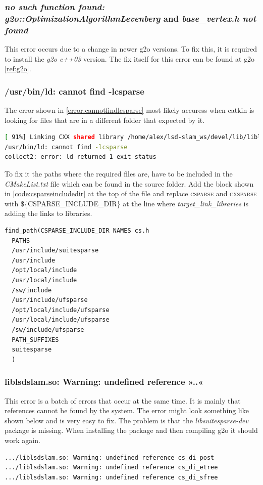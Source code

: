 \subsubsection{\textit{no such function found: g2o::OptimizationAlgorithmLevenberg} and \textit{base\_vertex.h not found}}
This error occurs due to a change in newer \gls{g2o} versions. To fix this, it is required to install the \textit{g2o c++03} version. The fix  itself for this error can be found at \gls{g2o} \ref{ref:g2o}.

\subsubsection{/usr/bin/ld: cannot find -lcsparse}
The error shown in \ref{error:cannotfindlcsparse} most likely accuress when catkin is looking for files that are in a different folder that expected by it.\newline
\begin{lstlisting}[language=bash,label={error:cannotfindlcsparse}]
[ 91%] Linking CXX shared library /home/alex/lsd-slam_ws/devel/lib/liblsdslam.so
/usr/bin/ld: cannot find -lcsparse
collect2: error: ld returned 1 exit status
\end{lstlisting}
To fix it the paths where the required files are, have to be included in the \textit{CMakeList.txt} file which can be found in the source folder. Add the block shown in \ref{code:csparseincludedir} at the top of the file and replace \textsc{csparse} and \textsc{cxsparse} with \textsc{\$\{CSPARSE\_INCLUDE\_DIR\}} at the line where \textit{target\_link\_libraries} is adding the links to libraries.\newline
\begin{lstlisting}[label={error:csparseincludedir}]
find_path(CSPARSE_INCLUDE_DIR NAMES cs.h
  PATHS
  /usr/include/suitesparse
  /usr/include
  /opt/local/include
  /usr/local/include
  /sw/include
  /usr/include/ufsparse
  /opt/local/include/ufsparse
  /usr/local/include/ufsparse
  /sw/include/ufsparse
  PATH_SUFFIXES
  suitesparse
  )
\end{lstlisting}

\subsubsection{liblsdslam.so: Warning: undefined reference »..«}
This error is a batch of errors that occur at the same time.
It is mainly that references cannot be found by the system. The error might look something like shown below and is very easy to fix. The problem is that the \textit{libsuitesparse-dev} package is missing. When installing the package and then compiling \gls{g2o} it should work again.\newline
\begin{lstlisting}[language=bash]
.../liblsdslam.so: Warning: undefined reference cs_di_post
.../liblsdslam.so: Warning: undefined reference cs_di_etree
.../liblsdslam.so: Warning: undefined reference cs_di_sfree
\end{lstlisting}

